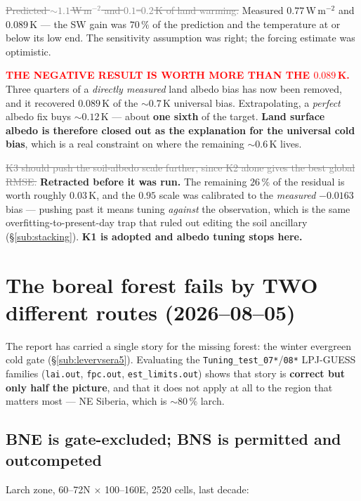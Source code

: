 \documentclass[10pt]{article}
\newcommand{\dead}[1]{\textcolor{gray}{\sout{#1}}}
\begin{document}
\dead{Predicted ${\sim}1.1$\,W\,m$^{-2}$ and $0.1$--$0.2$\,K of land warming.} Measured
$0.77$\,W\,m$^{-2}$ and $0.089$\,K --- the SW gain was $70\,\%$ of the prediction and the
temperature at or below its low end. The sensitivity assumption was right; the forcing
estimate was optimistic.

\textcolor{red}{\textbf{THE NEGATIVE RESULT IS WORTH MORE THAN THE $0.089$\,K.}} Three quarters
of a \emph{directly measured} land albedo bias has now been removed, and it recovered
$0.089$\,K of the ${\sim}0.7$\,K universal bias. Extrapolating, a \emph{perfect} albedo fix
buys ${\sim}0.12$\,K --- about \textbf{one sixth} of the target. \textbf{Land surface albedo is
therefore closed out as the explanation for the universal cold bias}, which is a real
constraint on where the remaining ${\sim}0.6$\,K lives.

\dead{K3 should push the soil-albedo scale further, since K2 alone gives the best global RMSE.}
\textbf{Retracted before it was run.} The remaining $26\,\%$ of the residual is worth roughly
$0.03$\,K, and the $0.95$ scale was calibrated to the \emph{measured} $-0.0163$ bias --- pushing
past it means tuning \emph{against} the observation, which is the same overfitting-to-present-day
trap that ruled out editing the soil ancillary (\S\ref{sub:stacking}). \textbf{K1 is adopted and
albedo tuning stops here.}

\section{The boreal forest fails by TWO different routes (2026--08--05)}\label{sec:tworoutes}
The report has carried a single story for the missing forest: the winter evergreen cold gate
(\S\ref{sub:levervsera5}). Evaluating the \texttt{Tuning\_test\_07*}/\texttt{08*} LPJ-GUESS
families (\texttt{lai.out}, \texttt{fpc.out}, \texttt{est\_limits.out}) shows that story is
\textbf{correct but only half the picture}, and that it does not apply at all to the region
that matters most --- NE Siberia, which is ${\sim}80\,\%$ larch.

\subsection{BNE is gate-excluded; BNS is permitted and outcompeted}\label{sub:tworoutes}
Larch zone, 60--72\textdegree N $\times$ 100--160\textdegree E, 2520 cells, last decade:
\end{document}
